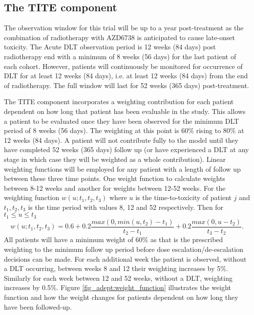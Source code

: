 \subsection{The TITE component}
\label{adept:The-TITE-component}

The observation window for this trial will be up to a year post-treatment as the combination of radiotherapy with AZD6738 is anticipated to cause late-onset toxicity. The Acute DLT observation period is 12 weeks (84 days) post radiotherapy end with a minimum of 8 weeks (56 days) for the last patient of each cohort. However, patients will continuously be monitored for occurrence of DLT for at least 12 weeks (84 days), i.e. at least 12 weeks (84 days) from the end of radiotherapy. The full window will last for 52 weeks (365 days) post-treatment.

The TITE component incorporates a weighting contribution for each patient dependent on how long that patient has been evaluable in the study. This allows a patient to be evaluated once they have been observed for the minimum DLT period of 8 weeks (56 days). The weighting at this point is 60\% rising to 80\% at 12 weeks (84 days). A patient will not contribute fully to the model until they have completed 52 weeks (365 days) follow up (or have experienced a DLT at any stage in which case they will be weighted as a whole contribution). Linear weighting functions will be employed for any patient with a length of follow up between these three time points. One weight function to calculate weights between 8-12 weeks and another for weights between 12-52 weeks. For the weighting function $w(u;t_1, t_2, t_3)$ where $u$ is the time-to-toxicity of patient $j$ and $t_1, t_2, t_3$ is the time period with values 8, 12 and 52 respectively. Then for $t_1 \leq u \leq t_3$
\begin{equation}
w(u;t_1,t_2,t_3) = 0.6 + 0.2\frac{max(0, min(u, t_2) - t_1)}{t_2 - t_1} + 0.2\frac{max(0, u - t_2)}{t_3-t_2}.
\end{equation} 
All patients will have a minimum weight of 60\% as that is the prescribed weighting to the  minimum follow up period before dose escalation/de-escalation decisions can be made. For each additional week the patient is observed, without a DLT occurring, between weeks 8 and 12 their weighting increases by 5\%. Similarly for each week between 12 and 52 weeks, without a DLT, weighting increases by 0.5\%. Figure \ref{fig_adept:weight_function} illustrates the weight function and how the weight changes for patients dependent on how long they have been followed-up.   

